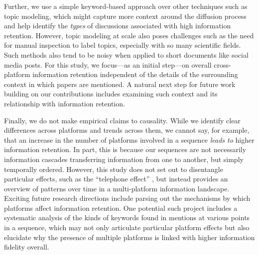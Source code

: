\documentclass[letterpaper]{article} %
\begin{document}
Further, we use a simple keyword-based approach over other techniques such as topic modeling, which might capture more context around the diffusion process and help identify the \textit{types} of discussions associated with high information retention. However, topic modeling at scale also poses challenges such as the need for manual inspection to label topics, especially with so many scientific fields. Such methods also tend to be noisy when applied to short documents like social media posts. For this study, we focus---as an initial step---on overall cross-platform information retention independent of the details of the surrounding context in which papers are mentioned. A natural next step for future work building on our contributions includes examining such context and its relationship with information retention.

Finally, we do not make empirical claims to causality. While we identify clear differences across platforms and trends across them, we cannot say, for example, that an increase in the number of platforms involved in a sequence \emph{leads to} higher information retention. In part, this is because our sequences are not necessarily information cascades transferring information from one to another, but simply temporally ordered. However, this study does not set out to disentangle particular effects, such as the ``telephone effect'' \citep{ribeiroMessageDistortionInformation2019}, but instead provides an overview of patterns over time in a multi-platform information landscape. Exciting future research directions include parsing out the mechanisms by which platforms affect information retention. One potential such project includes a systematic analysis of the kinds of keywords found in mentions at various points in a sequence, which may not only articulate particular platform effects but also elucidate why the presence of multiple platforms is linked with higher information fidelity overall.
\end{document}
